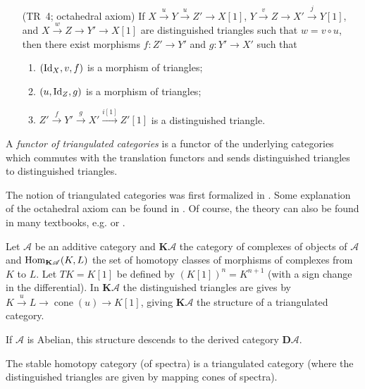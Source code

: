 \documentclass[english]{short-notes}
\newcommand\derived{\mathbf D}
\renewcommand\cat{\mathscr}
\begin{document}
\begin{Def}
\begin{enumerate}
            \item[(TR~4; octahedral axiom)]
                If $X \xrightarrow{u} Y \xrightarrow{u} Z' → X[1]$,
                $Y \xrightarrow{v} Z \xrightarrow{} X' \xrightarrow{j} Y[1]$, and
                $X \xrightarrow{w} Z \xrightarrow{} Y' \xrightarrow{} X[1]$
                are distinguished triangles such that $w = v∘u$, then there exist morphisms $f\colon Z' → Y'$ and $g\colon Y' → X'$ such that
                \begin{enumerate}[1)]
                    \item $(\id[X],v,f)$ is a morphism of triangles;
                    \item $(u, \id[Z],g)$ is a morphism of triangles;
                    \item $Z' \xrightarrow{f} Y' \xrightarrow{g} X' \xrightarrow{i[1]} Z'[1]$ is a distinguished triangle.
                \end{enumerate}
    \end{enumerate}
    A \emph{functor of triangulated categories} is a functor of the underlying categories which commutes with the translation functors and sends distinguished triangles to distinguished triangles.
\end{Def}

The notion of triangulated categories was first formalized in \cite{Verdier:1977:CategoriesDerivees}.
Some explanation of the octahedral axiom can be found in \cite[Section~1.1]{BeilinsonBernsteinDeligne:1982:FaisceauxPervers}.
Of course, the theory can also be found in many textbooks, e.g. \cite{KashiwaraSchapira:2006:CategoriesAndSheaves} or \cite{Weibel:1994:IntroToHomologicalAlgebra}.

\begin{Ex}
    Let $\cat A$ be an additive category and $\mathbf K\cat A$ the category of complexes of objects of $\cat A$ and $\Hom_{\mathbf K\cat A}(K,L)$ the set of homotopy classes of morphisms of complexes from $K$ to $L$.
    Let $TK = K[1]$ be defined by $(K[1])^n = K^{n+1}$ (with a sign change in the differential).
    In $\mathbf K\cat A$ the distinguished triangles are gives by $K \xrightarrow{u} L → \operatorname{cone}(u) → K[1]$, giving $\mathbf K\cat A$ the structure of a triangulated category.

    If $\cat A$ is Abelian, this structure descends to the derived category $\derived \cat A$.
\end{Ex}

\begin{Ex}
    The stable homotopy category (of spectra) is a triangulated category (where the distinguished triangles are given by mapping cones of spectra).
\end{Ex}
\end{document}

